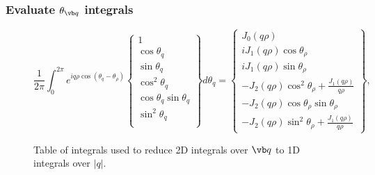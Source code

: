 \documentclass[letterpaper]{article}
\begin{document}
\subsubsection{Evaluate $\theta_{\vb q}$ integrals}
\label{qThetaIntegral}

\begin{figure}
$$
 \frac{1}{2\pi} 
 \int_0^{2\pi} e^{i q \rho \cos(\theta_q -\theta_\rho)}
 \left\{\begin{array}{c}
 1 \\[5pt]
 \cos\theta_q \\[5pt]
 \sin\theta_q \\[5pt]
 \cos^2\theta_q \\[5pt]
 \cos\theta_q \sin\theta_q \\[5pt]
 \sin^2\theta_q \\
 \end{array}\right\}
 d\theta_q 
= \left\{ \begin{array}{l}
    J_0 (q\rho)                           \\[5pt]
    i J_1(q\rho) \cos \theta_\rho          \\[5pt]
    i J_1(q\rho) \sin \theta_\rho          \\[5pt]
    - J_2(q\rho) \cos^2\theta_\rho + \frac{J_1(q\rho)}{q\rho} \\[5pt]
    -J_2(q\rho) \cos\theta_\rho \sin \theta_\rho              \\[5pt]
    - J_2(q\rho) \sin^2 \theta_\rho + \frac{J_1(q\rho)}{q\rho} 
  \end{array}\right\},
$$
\caption{Table of integrals used to reduce 2D integrals over $\vb q$ to
         1D integrals over $|q|$.}
\label{BesselIntegralTable}
\end{figure}
\end{document}
